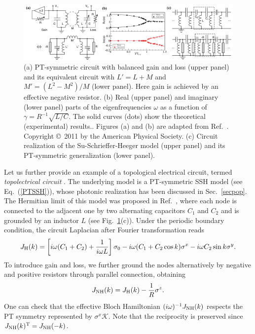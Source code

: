 \documentclass{tADP2e}
\theoremstyle{plain}
\theoremstyle{plain}
\theoremstyle{definition}
\begin{document}
\begin{figure}
\begin{center}
\includegraphics[width=14.5cm]{./Figures/fig_3_circuit.pdf}
\end{center}
\caption{(a) PT-symmetric circuit with balanced gain and loss (upper panel) and its equivalent circuit with $L'=L+M$ and $M'=(L^2-M^2)/M$ (lower panel). Here gain is achieved by an effective negative resistor. (b) Real (upper panel) and imaginary (lower panel) parts of the eigenfrequencies $\omega$ as a function of $\gamma=R^{-1}\sqrt{L/C}$. The solid curves (dots) show the theoretical (experimental) results.. Figures (a) and (b) are adapted from Ref.~\cite{SJ2011}. Copyright \copyright\,   2011 by the American Physical Society. (c) Circuit realization of the Su-Schrieffer-Heeger model (upper panel) and its PT-symmetric generalization (lower panel).}
\label{fig:3circuit}
\end{figure}


Let us further provide an example of a topological electrical circuit, termed \emph{topolectrical circuit} \cite{CHL18}. The underlying model is a PT-symmetric SSH model (see Eq.~(\ref{PTSSH})), whose photonic realization \cite{WS17} has been discussed in Sec.~\ref{secpop}. The Hermitian limit of this model was proposed in Ref.~\cite{CHL18}, where each node is connected to the adjacent one by two alternating capacitors $C_1$ and $C_2$ and is grounded by an inductor $L$ (see Fig.~\ref{fig:3circuit}(c)). Under the periodic boundary condition, the circuit Laplacian after Fourier transformation reads
\begin{equation}
J_{\rm H}(k)=\left[i\omega(C_1+C_2)+\frac{1}{i\omega L}\right]\sigma_0-i\omega(C_1+C_2\cos k)\sigma^x-i\omega C_2\sin k\sigma^y.
\end{equation}
To introduce gain and loss, we further ground the nodes alternatively by negative and positive resistors through parallel connection, obtaining
\begin{equation}
J_{\rm NH}(k)=J_{\rm H}(k)-\frac{1}{R}\sigma^z.
\end{equation}
One can check that the effective Bloch Hamiltonian $(i\omega)^{-1}J_{\rm NH}(k)$ respects the PT symmetry represented by $\sigma^x\mathcal{K}$. Note that the reciprocity is preserved since %
$J_{\rm NH}(k)^{\rm T}=J_{\rm NH}(-k)$. 
\end{document}
